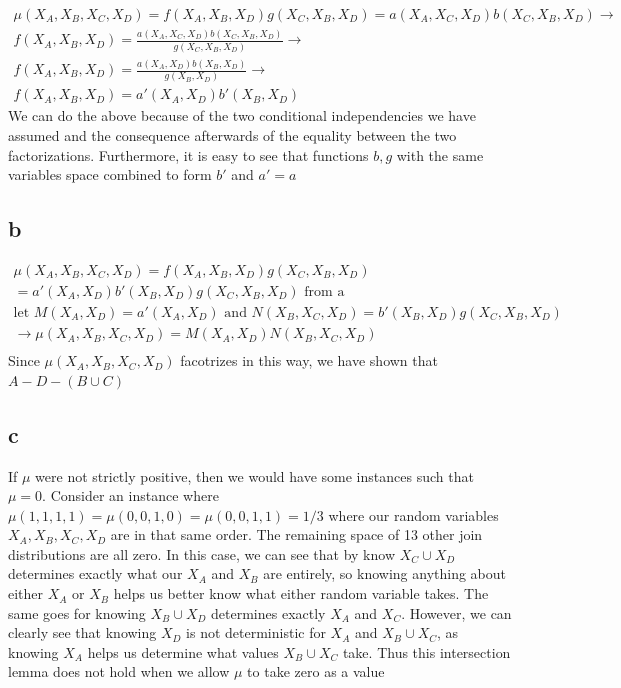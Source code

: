 \documentclass[12pt]{article}
\begin{document}
\begin{gather}
\mu(X_A,X_B,X_C,X_D) = f(X_A,X_B,X_D)g(X_C,X_B,X_D) = a(X_A,X_C,X_D)b(X_C,X_B,X_D) \rightarrow \\
f(X_A,X_B,X_D) = \frac{a(X_A,X_C,X_D)b(X_C,X_B,X_D)}{g(X_C,X_B,X_D)} \rightarrow \\
f(X_A,X_B,X_D)= \frac{a(X_A,X_D)b(X_B,X_D)}{g(X_B,X_D)} \rightarrow \\
f(X_A,X_B,X_D) = a'(X_A,X_D)b'(X_B,X_D)   
\end{gather}
We can do the above because of the two conditional independencies we have assumed and the consequence afterwards of the equality between the two factorizations. Furthermore, it is easy to see that functions $b,g$ with the same variables space combined to form $b'$ and $a'=a$
\\


\subsection{b}
\begin{gather}
\mu(X_A,X_B,X_C,X_D) = f(X_A,X_B,X_D)g(X_C,X_B,X_D) \\
= a'(X_A,X_D)b'(X_B,X_D)g(X_C,X_B,X_D) \text{ from a} \\
\text{let } M(X_A,X_D) =  a'(X_A,X_D) \text{ and } N(X_B,X_C,X_D) = b'(X_B,X_D)g(X_C,X_B,X_D) \\
\rightarrow \mu(X_A,X_B,X_C,X_D)= M(X_A,X_D)N(X_B,X_C,X_D) \\
\end{gather}
Since $\mu(X_A,X_B,X_C,X_D)$ facotrizes in this way, we have shown that $A-D-(B\cup C)$

\subsection{c}
If $\mu$ were not strictly positive, then we would have some instances such that $\mu = 0$. Consider an instance where $\mu(1,1,1,1) = \mu(0,0,1,0) = \mu(0,0,1,1) = 1/3$ where our random variables $X_A,X_B,X_C,X_D$ are in that same order. The remaining space of 13 other join distributions are all zero. In this case, we can see that by know $X_C\cup X_D$ determines exactly what our $X_A$ and $X_B$ are entirely, so knowing anything about either $X_A$ or $X_B$ helps us better know what either random variable takes. The same goes for knowing $X_B\cup X_D$ determines exactly $X_A$ and $X_C$. However, we can clearly see that knowing $X_D$ is not deterministic for $X_A$ and $X_B\cup X_C$, as knowing $X_A$ helps us determine what values $X_B\cup X_C$ take. Thus this intersection lemma does not hold when we allow $\mu$ to take zero as a value
\end{document}
